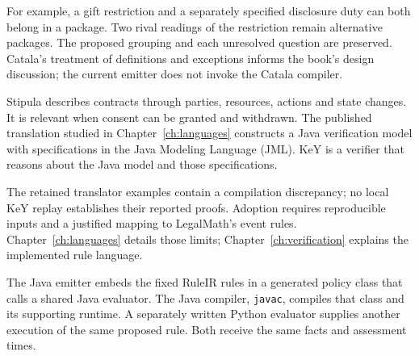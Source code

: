 For example, a gift restriction and a separately specified disclosure duty can
both belong in a package. Two rival readings of the restriction remain
alternative packages. The proposed grouping and each unresolved question are
preserved. Catala's treatment of definitions and exceptions informs the book's
design discussion; the current emitter does not invoke the Catala compiler.

Stipula describes contracts through parties, resources, actions and state
changes. It is relevant when consent can be granted and withdrawn. The
published translation studied in Chapter~\ref{ch:languages} constructs a Java
verification model with specifications in the Java Modeling Language (JML).
KeY is a verifier that reasons about the Java model and those specifications.

\begin{MapDiagram}
\end{MapDiagram}

The retained translator examples contain a compilation discrepancy; no local
KeY replay establishes their reported proofs. Adoption requires reproducible
inputs and a justified mapping to LegalMath's event rules.
Chapter~\ref{ch:languages} details those limits; Chapter~\ref{ch:verification}
explains the implemented rule language.

\clearpage
{}
The Java emitter embeds the fixed RuleIR rules in a generated policy class
that calls a shared Java evaluator. The Java compiler, \texttt{javac}, compiles
that class and its supporting runtime. A separately written Python evaluator
supplies another execution of the same proposed rule. Both receive the same
facts and assessment times.

